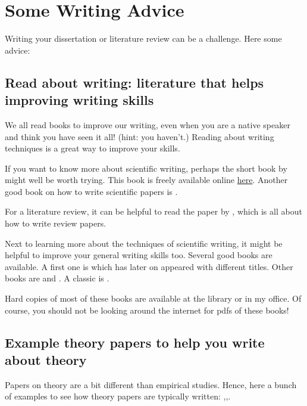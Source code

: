 \documentclass[
]{book}
\begin{document}
\hypertarget{some-writing-advice}{%
\chapter{Some Writing Advice}\label{some-writing-advice}}

Writing your dissertation or literature review can be a challenge. Here some advice:

\hypertarget{read-about-writing-literature-that-helps-improving-writing-skills}{%
\section{Read about writing: literature that helps improving writing skills}\label{read-about-writing-literature-that-helps-improving-writing-skills}}

We all read books to improve our writing, even when you are a native speaker and think you have seen it all! (hint: you haven't.) Reading about writing techniques is a great way to improve your skills.

If you want to know more about scientific writing, perhaps the short book by \citet{Mack2018} might well be worth trying. This book is freely available online \href{https://spie.org/Publications/Book/2317706?SSO=1}{here}. Another good book on how to write scientific papers is \citet{Gastel2022}.

For a literature review, it can be helpful to read the paper by \citet{Sayer2018}, which is all about how to write review papers.

Next to learning more about the techniques of scientific writing, it might be helpful to improve your general writing skills too. Several good books are available. A first one is \citet{Williams1990} which has later on appeared
with different titles. Other books are \citet{Pinker2014} and \citet{Zinsser2006}. A classic is \citet{Strunk1959}.

Hard copies of most of these books are available at the library or in my office. Of course, you should not be looking around the internet for pdfs of these books!

\hypertarget{example-theory-papers-to-help-you-write-about-theory}{%
\section{Example theory papers to help you write about theory}\label{example-theory-papers-to-help-you-write-about-theory}}

Papers on theory are a bit different than empirical studies. Hence, here a bunch of examples to see how theory papers are typically written: \citep{Fawcett2007},\citep{Trimmer2015},\citep{Kahn2015}.
\end{document}
